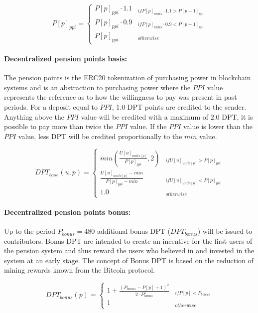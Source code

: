 \begin{equation}
P[p]_{ppi} = \begin{cases} 
P[p]_{ppi} \cdot 1.1 & _{if P[p]_{units} \cdot 1.1 > P[p-1]_{ppi}} \\
P[p]_{ppi} \cdot 0.9 & _{if P[p]_{units} \cdot 0.9 < P[p-1]_{ppi}} \\
P[p]_{ppi} & _{otherwise}
\end{cases}
\end{equation}

\paragraph*{Decentralized pension points basis:}
The pension points is the ERC20 tokenization of purchasing power in blockchain systems and is an abstraction to purchasing power where the $PPI$ value represents the reference as to how the willingness to pay was present in past periods. For a deposit equal to $PPI$, 1.0 DPT points are credited to the sender. Anything above the $PPI$ value will be credited with a maximum of 2.0 DPT, it is possible to pay more than twice the $PPI$ value. If the $PPI$ value is lower than the $PPI$ value, less DPT will be credited proportionally to the $min$ value.

\begin{dmath}
DPT_{base}(u, p) = \begin{cases} 
min(\frac{U[u]_{units[p]}} {P[p]_{ppi}}, 2) 
  & _{if U[u]_{units[p]} > P[p]_{ppi}} \\
\frac{U[u]_{units[p]} - min} {P[p]_{ppi} - min} 
  & _{if U[u]_{units[p]} < P[p]_{ppi}} \\
1.0 & _{otherwise}
\end{cases}
\end{dmath}

\paragraph*{Decentralized pension points bonus:}
Up to the period $P_{bonus} = 480$ additional bonus DPT ($DPT_{bonus}$) will be issued to contributors. Bonus DPT are intended to create an incentive for the first users of the pension system and thus reward the users who believed in and invested in the system at an early stage. The concept of Bonus DPT is based on the reduction of mining rewards known from the Bitcoin protocol.

\begin{equation}
DPT_{bonus}(p) = \begin{cases} 
1 + \frac{(P_{bonus} - P[p] + 1)^2}
      {2 \cdot P_{bonus}^2} & _{if P[p] < P_{bonus}} \\
1 & _{otherwise} 
\end{cases}
\end{equation}